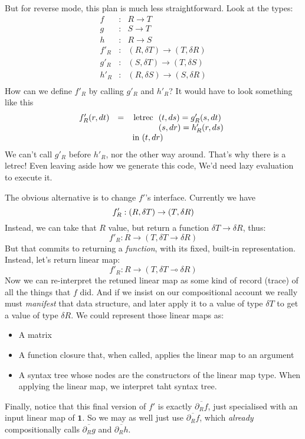 \documentclass[sigplan,review]{acmart}
\newcommand{\deriv}{\partial}  %
\renewcommand{\to}{\rightarrow}    %
\newcommand{\linto}{\multimap}     %
\newcommand{\gradft}[1]{\deriv_R#1}  %
\newcommand{\tangent}[1]{\delta #1}
\newcommand{\ogradft}[1]{\overline{\gradft{#1}}}  %
\newcommand{\fwdDf}[1]{#1'}  %
\newcommand{\revDf}[1]{#1'_R}  %
\newcommand{\lmone}{\mathbf{1}}      %
\begin{document}
But for reverse mode, this plan is much less straightforward.   Look at the types:
$$
\begin{array}{rcl}
f & : & R \to T \\
g & : & S \to T \\
h & : & R \to S \\
\revDf{f} & : & (R, \tangent{T}) \to (T, \tangent{R}) \\
\revDf{g} & : & (S, \tangent{T}) \to (T, \tangent{S}) \\
\revDf{h} & : & (R, \tangent{S}) \to (S, \tangent{R}) \\
\end{array}
$$
How can we define $\revDf{f}$ by calling $\revDf{g}$ and $\revDf{h}$?  It would
have to look something like this
$$
\begin{array}{rcl}
\revDf{f}(r,dt) & = & \lstinline|letrec| \begin{array}[t]{l}
                          (t, ds) = \revDf{g}( s, dt ) \\
                          (s, dr) = \revDf{h}( r, ds ) \\
                        \end{array} \\
 && \lstinline|in| \; (t, dr)
\end{array}
$$
We can't call $\revDf{g}$ before $\revDf{h}$, nor the other way around.
That's why there is a letrec!  Even leaving aside how we generate this code,
We'd need lazy evaluation to execute it.

The obvious alternative is to change $\fwdDf{f}$'s interface.  Currently we have
$$
\revDf{f} : (R, \tangent{T}) \to (T, \tangent{R}) \\
$$
Instead, we can take that $R$ value, but return a function
$\tangent{T} \to \tangent{R}$, thus:
$$
\revDf{f} : R \to (T, \tangent{T} \to \tangent{R})
$$
But that commits to returning a \emph{function}, with its fixed, built-in representation.
Instead, let's return linear map:
$$
\revDf{f} : R \to (T, \tangent{T} \linto \tangent{R})
$$
Now we can re-interpret the retuned linear map as some kind of record (trace) of
all the things that $f$ did.  And if we insist on our compositional account
we really must \emph{manifest} that data structure, and later apply it to a value of
type $\tangent{T}$ to get a value of type $\tangent{R}$.  We could represent those linear maps as:
\begin{itemize}
\item A matrix
\item A function closure that, when called, applies the linear map to an argument
\item A syntax tree whose nodes are the constructors of the linear map type.
  When applying the linear map, we interpret taht syntax tree.
\end{itemize}
Finally, notice that this final version of $\fwdDf{f}$ is exactly $\ogradft{f}$,
just specialised with an input linear map of $\lmone$.  So we may as well
just use $\ogradft{f}$, which \emph{already} compositionally calls $\ogradft{g}$
and $\ogradft{h}$.
\end{document}
